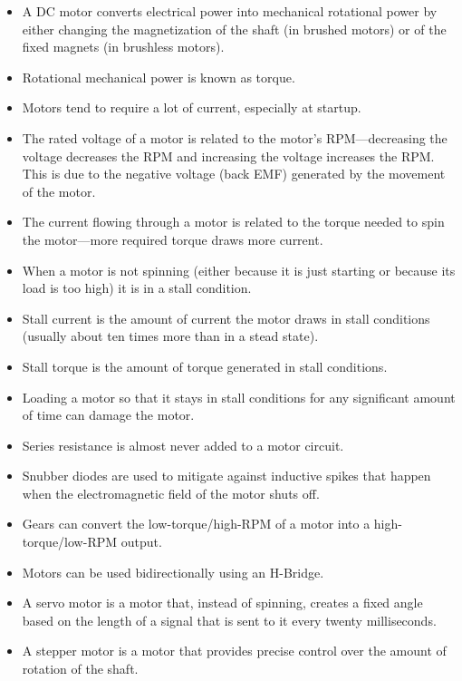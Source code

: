 \begin{itemize}
\item A DC motor converts electrical power into mechanical rotational power by either changing the magnetization of the shaft (in brushed motors) or of the fixed magnets (in brushless motors).
\item Rotational mechanical power is known as torque.
\item Motors tend to require a lot of current, especially at startup.
\item The rated voltage of a motor is related to the motor's RPM---decreasing the voltage decreases the RPM and increasing the voltage increases the RPM.  This is due to the negative voltage (back EMF) generated by the movement of the motor.
\item The current flowing through a motor is related to the torque needed to spin the motor---more required torque draws more current.
\item When a motor is not spinning (either because it is just starting or because its load is too high) it is in a stall condition.
\item Stall current is the amount of current the motor draws in stall conditions (usually about ten times more than in a stead state).
\item Stall torque is the amount of torque generated in stall conditions.
\item Loading a motor so that it stays in stall conditions for any significant amount of time can damage the motor.
\item Series resistance is almost never added to a motor circuit.
\item Snubber diodes are used to mitigate against inductive spikes that happen when the electromagnetic field of the motor shuts off.
\item Gears can convert the low-torque/high-RPM of a motor into a high-torque/low-RPM output.
\item Motors can be used bidirectionally using an H-Bridge.
\item A servo motor is a motor that, instead of spinning, creates a fixed angle based on the length of a signal that is sent to it every twenty milliseconds.
\item A stepper motor is a motor that provides precise control over the amount of rotation of the shaft.
\end{itemize}

\applysection


